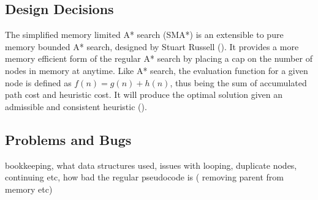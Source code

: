 \documentclass[]{article}
\begin{document}
\vspace*{0.8cm}
\subsection*{Design Decisions}

The simplified memory limited A* search (SMA*) is an extensible to pure memory bounded A* search, designed by Stuart Russell (\cite{russell_paper}). It provides a more memory efficient form of the regular A* search by placing a cap on the number of nodes in memory at anytime. Like A* search, the evaluation function for a given node is defined as $f(n)=g(n)+h(n)$, thus being the sum of accumulated path cost and heuristic cost. It will produce the optimal solution given an admissible and consistent heuristic (\cite{norvig}).

\subsection*{Problems and Bugs}

bookkeeping, what data structures used, issues with looping, duplicate nodes, continuing etc, how bad the regular pseudocode is ( removing parent from memory etc)


\break
\setlength{}
\printbibliography[title={References}]

\end{document}
